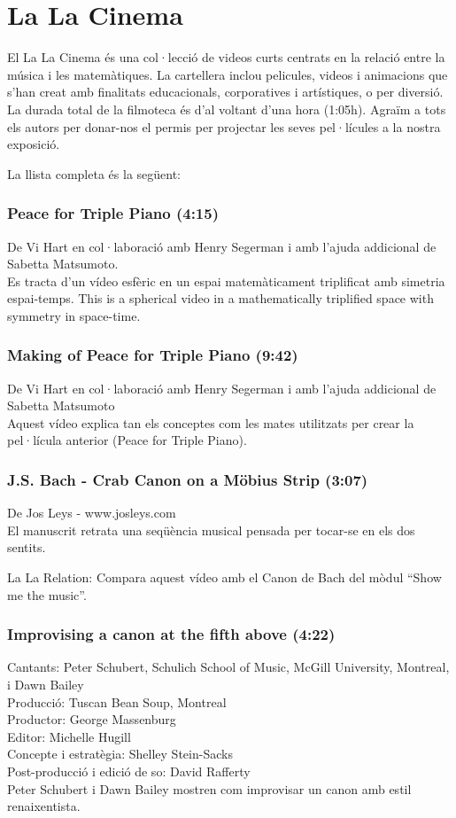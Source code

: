 \section{La La Cinema}
El La La Cinema és una col·lecció de videos curts centrats en la relació entre la música i les matemàtiques. La cartellera inclou pelicules, videos i animacions que s'han creat amb finalitats educacionals, corporatives i artístiques, o per diversió. La durada total de la filmoteca és d'al voltant d'una hora (1:05h). Agraïm a tots els autors per donar-nos el permis per projectar les seves pel·lícules a la nostra exposició.

La llista completa és la següent:

\subsubsection*{Peace for Triple Piano (4:15)}
De Vi Hart en col·laboració amb Henry Segerman i amb l'ajuda addicional de Sabetta Matsumoto. \\
Es tracta d'un vídeo esfèric en un espai matemàticament triplificat amb simetria espai-temps.
This is a spherical video in a mathematically triplified space with symmetry in space-time.

\subsubsection*{Making of Peace for Triple Piano (9:42)}
De Vi Hart en col·laboració amb Henry Segerman i amb l'ajuda addicional de Sabetta Matsumoto\\
Aquest vídeo explica tan els conceptes com les mates utilitzats per crear la pel·lícula anterior (Peace for Triple Piano).

\subsubsection*{J.S. Bach - Crab Canon on a Möbius Strip (3:07)}
De Jos Leys - www.josleys.com \\
El manuscrit retrata una seqüència musical pensada per tocar-se en els dos sentits.

La La Relation: Compara aquest vídeo amb el Canon de Bach del mòdul ``Show me the music''.

\subsubsection*{Improvising a canon at the fifth above (4:22)}
Cantants: Peter Schubert, Schulich School of Music, McGill University, Montreal, i Dawn Bailey\\
Producció: Tuscan Bean Soup, Montreal\\
Productor: George Massenburg\\
Editor: Michelle Hugill\\
Concepte i estratègia: Shelley Stein-Sacks\\
Post-producció i edició de so: David Rafferty\\
Peter Schubert i Dawn Bailey mostren com improvisar un canon amb estil renaixentista.

